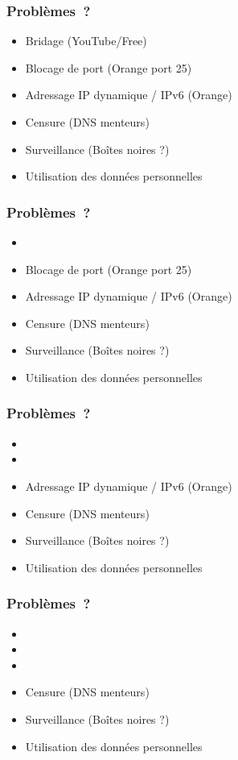 \documentclass[notes=hide]{beamer}
\begin{document}
\begin{frame}
		  \frametitle{\textcolor{titre}{Problèmes~?}}
					 \begin{itemize}
								\item Bridage (YouTube/Free)
								\item Blocage de port (Orange port 25)
								\item Adressage IP dynamique / IPv6 (Orange)
								\item Censure (DNS menteurs)
								\item Surveillance (Boîtes noires ?)
								\item Utilisation des données personnelles
					\end{itemize}
\end{frame}

\begin{frame}
		  \frametitle{\textcolor{titre}{Problèmes~?}}
					 \begin{itemize}
								\item
								\item Blocage de port (Orange port 25)
								\item Adressage IP dynamique / IPv6 (Orange)
								\item Censure (DNS menteurs)
								\item Surveillance (Boîtes noires ?)
								\item Utilisation des données personnelles
					\end{itemize}
\end{frame}

\begin{frame}
		  \frametitle{\textcolor{titre}{Problèmes~?}}
					 \begin{itemize}
								\item
								\item
								\item Adressage IP dynamique / IPv6 (Orange)
								\item Censure (DNS menteurs)
								\item Surveillance (Boîtes noires ?)
								\item Utilisation des données personnelles
					\end{itemize}
\end{frame}





\begin{frame}
		  \frametitle{\textcolor{titre}{Problèmes~?}}
					 \begin{itemize}
								\item
								\item
								\item
								\item Censure (DNS menteurs)
								\item Surveillance (Boîtes noires ?)
								\item Utilisation des données personnelles
					\end{itemize}
\end{frame}
\end{document}
